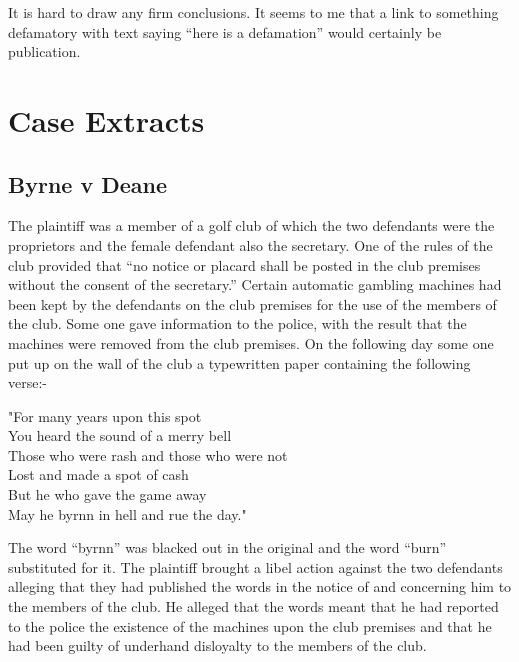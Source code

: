 \documentclass[]{article}
\begin{document}
It is hard to draw any firm conclusions. It seems to me that a link to
something defamatory with text saying ``here is a defamation'' would
certainly be publication.

\appendix
{}
\setcounter{secnumdepth}{1}
\section{Case Extracts}

\subsection{Byrne v Deane}

The plaintiff was a member of a golf club of which the two defendants
were the proprietors and the female defendant also the secretary. One of
the rules of the club provided that ``no notice or placard shall be
posted in the club premises without the consent of the secretary.''
Certain automatic gambling machines had been kept by the defendants on
the club premises for the use of the members of the club. Some one gave
information to the police, with the result that the machines were
removed from the club premises. On the following day some one put up on
the wall of the club a typewritten paper containing the following
verse:-

"For many years upon this spot\\You heard the sound of a merry
bell\\Those who were rash and those who were not\\Lost and made a spot
of cash\\But he who gave the game away\\May he byrnn in hell and rue the
day."

The word ``byrnn'' was blacked out in the original and the word ``burn''
substituted for it. The plaintiff brought a libel action against the two
defendants alleging that they had published the words in the notice of
and concerning him to the members of the club. He alleged that the words
meant that he had reported to the police the existence of the machines
upon the club premises and that he had been guilty of underhand
disloyalty to the members of the club.
\end{document}
